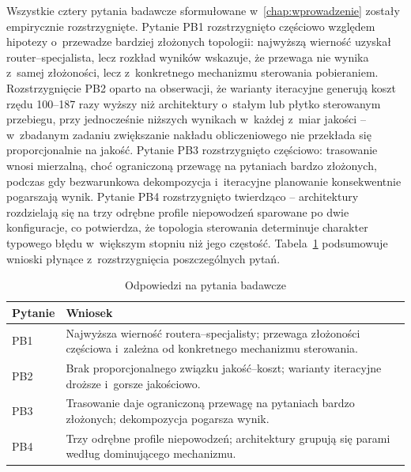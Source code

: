 Wszystkie cztery pytania badawcze sformułowane w~\cref{chap:wprowadzenie}
zostały empirycznie rozstrzygnięte. Pytanie PB1 rozstrzygnięto częściowo
względem hipotezy o~przewadze bardziej złożonych topologii: najwyższą wierność
uzyskał router--specjalista, lecz rozkład wyników wskazuje, że przewaga nie
wynika z~samej złożoności, lecz z~konkretnego mechanizmu sterowania
pobieraniem. Rozstrzygnięcie PB2 oparto na obserwacji, że warianty iteracyjne
generują koszt rzędu 100--187 razy wyższy niż architektury o~stałym lub płytko
sterowanym przebiegu, przy jednocześnie niższych wynikach w~każdej z~miar
jakości -- w~zbadanym zadaniu zwiększanie nakładu obliczeniowego nie przekłada
się proporcjonalnie na jakość. Pytanie PB3 rozstrzygnięto częściowo: trasowanie
wnosi mierzalną, choć ograniczoną przewagę na pytaniach bardzo złożonych,
podczas gdy bezwarunkowa dekompozycja i~iteracyjne planowanie konsekwentnie
pogarszają wynik. Pytanie PB4 rozstrzygnięto twierdząco -- architektury
rozdzielają się na trzy odrębne profile niepowodzeń sparowane po dwie
konfiguracje, co potwierdza, że topologia sterowania determinuje charakter
typowego błędu w~większym stopniu niż jego częstość.
Tabela~\ref{tab:odpowiedzi-na-pytania-badawcze} podsumowuje wnioski płynące
z~rozstrzygnięcia poszczególnych pytań.

\begin{table}[H]
  \caption{Odpowiedzi na pytania badawcze}\label{tab:odpowiedzi-na-pytania-badawcze}
  \centering
  \small
  \renewcommand{\arraystretch}{1.3}
  \begin{tabularx}{\textwidth}{@{} l X @{}}
    \toprule
    \textbf{Pytanie} & \textbf{Wniosek}                                                         \\
    \midrule
    PB1
    & Najwyższa wierność routera--specjalisty; przewaga złożoności częściowa
    i~zależna od konkretnego mechanizmu sterowania.                                             \\
    PB2
    & Brak proporcjonalnego związku jakość--koszt; warianty iteracyjne droższe
    i~gorsze jakościowo.                                                                        \\
    PB3
    & Trasowanie daje ograniczoną przewagę na pytaniach bardzo złożonych;
    dekompozycja pogarsza wynik.                                                                \\
    PB4
    & Trzy odrębne profile niepowodzeń; architektury grupują się parami
    według dominującego mechanizmu.                                                             \\
    \bottomrule
  \end{tabularx}
\end{table}

